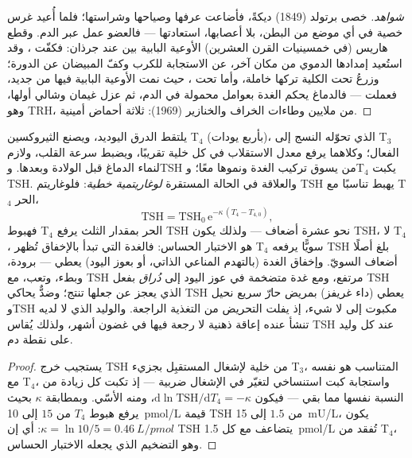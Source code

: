 \begin{proof}[شواهد]
خصى برتولد (1849) ديكةً، فأضاعت عرفها وصياحها وشراستها؛
فلما أُعيد غرس خصية في أي موضع من البطن، بلا أعصابها،
استعادتها --- فالعضو عمل عبر الدم. وقطع هاريس (في خمسينيات
القرن العشرين) الأوعية البابية بين   عند
جرذان: فكفّت ، وقد استُعيد إمدادها الدموي من مكان
آخر، عن الاستجابة للكرب وكفّ المبيضان عن الدورة؛ وزرعُ
 تحت الكلية تركها خاملة، وأما تحت ، حيث نمت
الأوعية البابية فيها من جديد، فعملت --- فالدماغ يحكم الغدة
بعوامل محمولة في الدم، ثم عزل غيمان وشالي أولها، وهو TRH،
من ملايين وطاءات الخراف والخنازير (1969): ثلاثة أحماض
أمينية.
\end{proof}

\begin{proposition}\label{prop:b3:endocrinology:thyroid}
يلتقط الدرق اليوديد، ويصنع الثيروكسين T$_{4}$ (بأربع
يودات)، الذي تحوّله النسج إلى T$_{3}$ الفعال؛ وكلاهما يرفع
معدل الاستقلاب في كل خلية تقريبًا، ويضبط سرعة القلب، ولازم
لنماء الدماغ قبل الولادة وبعدها. وTSH من  يسوق تركيب
الغدة ونموها معًا؛ وT$_{4}$ يكبت TSH. والعلاقة في الحالة
المستقرة \emph{لوغاريتمية خطية}: فلوغاريتم TSH يهبط تناسبًا
مع T$_{4}$ الحر،
\[
\text{TSH} = \text{TSH}_{0}\,\mathrm{e}^{-\kappa\,(T_{4} - T_{4,0})},
\]
فهبوط T$_{4}$ الحر بمقدار الثلث يرفع TSH نحو عشرة أضعاف ---
ولذلك يكون TSH، لا T$_{4}$، هو الاختبار الحساس: فالغدة التي
تبدأ بالإخفاق تُظهر T$_{4}$ سويًّا يرفعه TSH بلغ أصلًا أضعاف
السويّ. وإخفاق الغدة (بالتهدم المناعي الذاتي، أو بعوز اليود)
يعطي \emph{} --- برودة، وبطء، وتعب، مع TSH مرتفع،
ومع غدة متضخمة في عوز اليود إلى \emph{دُراق} بفعل TSH الذي
يعجز عن جعلها تنتج؛ وضدٌّ يحاكي TSH يعطي \emph{}
(داء غريفز) بمريض حارّ سريع نحيل وTSH مكبوت إلى لا شيء، إذ
يفلت التحريض من التغذية الراجعة. والوليد الذي لا 
لديه تنشأ عنده إعاقة ذهنية لا رجعة فيها في غضون أشهر، ولذلك
يُقاس TSH عند كل وليد على نقطة دم.
\end{proposition}
\begin{proof}
يستجيب خرج TSH من خلية  لإشغال المستقبِل بجزيء T$_{3}$،
المتناسب هو نفسه مع T$_{4}$، واستجابة كبت استنساخي لتغيّر في
الإشغال ضربية --- إذ تكبت كل زيادة من  النسبة نفسها
مما بقي --- فيكون $\mathrm{d}\ln\text{TSH}/\mathrm{d}T_{4} = -\kappa$،
ومنه الأسّي. وبمطابقة $\kappa$ بحيث يرفع هبوط $T_{4}$ من
$15$ إلى \qty{10}{pmol/L} قيمة TSH من $1.5$ إلى \qty{15}{mU/L}،
يكون $\kappa = \ln 10/5 = \qty{0.46}{L/pmol}$: أي إن TSH يتضاعف
مع كل \qty{1.5}{pmol/L} تُفقد من T$_{4}$، وهو التضخيم الذي
يجعله الاختبار الحساس.
\end{proof}

